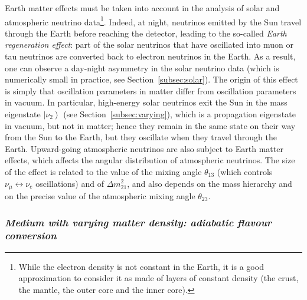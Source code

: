 Earth matter effects must be taken into account in the analysis of solar and atmospheric
neutrino data\footnote{While the electron density is not constant in the Earth, it is a good
approximation to consider it as made of layers of constant density (the crust, the mantle,
the outer core and the inner core).}.
Indeed, at night, neutrinos emitted by the Sun travel through the Earth
before reaching the detector, leading to the so-called {\it Earth regeneration effect}:
part of the solar neutrinos that have oscillated into muon or tau
neutrinos are converted back to electron neutrinos in the Earth. As a result, one can
observe a day-night asymmetry in the solar neutrino data (which is numerically small
in practice, see Section~\ref{subsec:solar}). %
The origin of this effect
is simply that oscillation parameters in matter differ from oscillation parameters in vacuum.
In particular, high-energy solar neutrinos exit the Sun in the mass eigenstate
$\left| \nu_2 \right>$ (see Section~\ref{subsec:varying}), which is a propagation eigenstate
in vacuum, but not in matter; %
hence they remain in the same state on their way from the Sun to the Earth,
but they oscillate when they travel through the Earth.
Upward-going atmospheric neutrinos are also subject to Earth matter effects,
which affects the angular distribution of atmospheric neutrinos. 
The size of the effect is related to the value of the mixing angle $\theta_{13}$
(which controls $\nu_\mu \leftrightarrow \nu_e$ oscillations) and of $\Delta m^2_{21}$,
and also depends on the mass hierarchy and on the precise value of the atmospheric
mixing angle $\theta_{23}$.


\subsubsection{\it Medium with varying matter density: adiabatic flavour conversion    %
\label{subsec:varying}}                                                                                                   %

